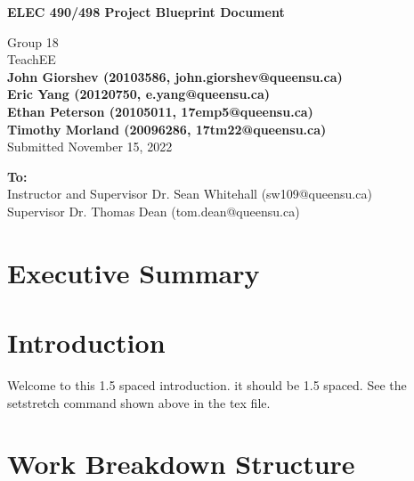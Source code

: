 \documentclass[letterpaper,12pt]{article}
\begin{document}
\begin{titlepage}
    \begin{center}
        \vspace*{1cm}

        \Large
        \textbf{ELEC 490/498 Project Blueprint Document}

        \vspace{0.5cm}
        Group 18\\
        TeachEE\\
        \vspace{0.5cm}
        \normalsize
        \textbf{John Giorshev (20103586, john.giorshev@queensu.ca) \\ Eric Yang (20120750, e.yang@queensu.ca) \\ Ethan Peterson (20105011, 17emp5@queensu.ca) \\ Timothy Morland (20096286, 17tm22@queensu.ca)}\\
        \vspace{0.5cm}
        Submitted November 15, 2022\\

        \vfill
            
        \textbf{To:}\\
        Instructor and Supervisor Dr. Sean Whitehall (sw109@queensu.ca) \\
        Supervisor Dr. Thomas Dean (tom.dean@queensu.ca) \\
            
        \vspace{1.8cm}

    \end{center}
\end{titlepage}
\section*{Executive Summary}

\newpage

\tableofcontents
\listoffigures
\listoftables
\newpage
{}
\section{Introduction} \label{sec:intro} %
Welcome to this 1.5 spaced introduction. it should be 1.5 spaced. See the setstretch command shown above in the tex file.

\section{Work Breakdown Structure} %
\end{document}
